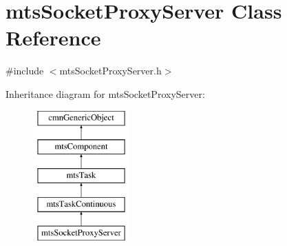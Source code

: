 \hypertarget{classmts_socket_proxy_server}{\section{mts\-Socket\-Proxy\-Server Class Reference}
\label{classmts_socket_proxy_server}
}


{\ttfamily \#include $<$mts\-Socket\-Proxy\-Server.\-h$>$}

Inheritance diagram for mts\-Socket\-Proxy\-Server\-:\begin{figure}[H]
\begin{center}
\leavevmode
\includegraphics[height=5.000000cm]{de/dad/classmts_socket_proxy_server}
\end{center}
\end{figure}
